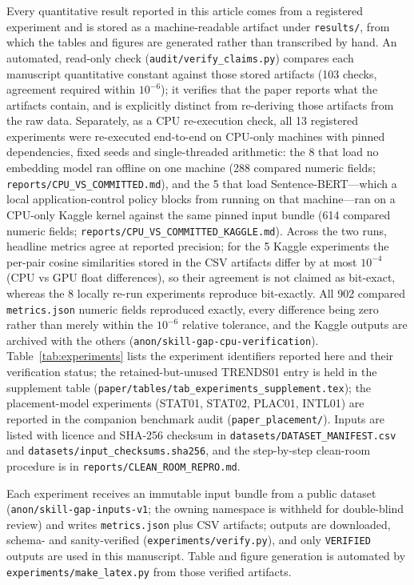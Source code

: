 \documentclass[journal]{IEEEtran}
\begin{document}
Every quantitative result reported in this article comes from a registered experiment and is stored as a machine-readable artifact under \texttt{results/}, from which the tables and figures are generated rather than transcribed by hand. An automated, read-only check (\texttt{audit/verify\_claims.py}) compares each manuscript quantitative constant against those stored artifacts (103 checks, agreement required within $10^{-6}$); it verifies that the paper reports what the artifacts contain, and is explicitly distinct from re-deriving those artifacts from the raw data. Separately, as a CPU re-execution check, all 13 registered experiments were re-executed end-to-end on CPU-only machines with pinned dependencies, fixed seeds and single-threaded arithmetic: the 8 that load no embedding model ran offline on one machine (288 compared numeric fields; \texttt{reports/CPU\_VS\_COMMITTED.md}), and the 5 that load Sentence-BERT---which a local application-control policy blocks from running on that machine---ran on a CPU-only Kaggle kernel against the same pinned input bundle (614 compared numeric fields; \texttt{reports/CPU\_VS\_COMMITTED\_KAGGLE.md}). Across the two runs, headline metrics agree at reported precision; for the 5 Kaggle experiments the per-pair cosine similarities stored in the CSV artifacts differ by at most $10^{-4}$ (CPU vs GPU float differences), so their agreement is not claimed as bit-exact, whereas the 8 locally re-run experiments reproduce bit-exactly. All 902 compared \texttt{metrics.json} numeric fields reproduced exactly, every difference being zero rather than merely within the $10^{-6}$ relative tolerance, and the Kaggle outputs are archived with the others (\texttt{anon/skill-gap-cpu-verification}). Table~\ref{tab:experiments} lists the experiment identifiers reported here and their verification status; the retained-but-unused TRENDS01 entry is held in the supplement table (\texttt{paper/tables/tab\_experiments\_supplement.tex}); the placement-model experiments (STAT01, STAT02, PLAC01, INTL01) are reported in the companion benchmark audit (\texttt{paper\_placement/}). Inputs are listed with licence and SHA-256 checksum in \texttt{datasets/DATASET\_MANIFEST.csv} and \texttt{datasets/input\_checksums.sha256}, and the step-by-step clean-room procedure is in \texttt{reports/CLEAN\_ROOM\_REPRO.md}.

\begin{table}[!htbp]
\centering
\caption{Experiment Registry: Provenance of All Reported Results (status per \texttt{results/registry.json})}
\label{tab:experiments}
\resizebox{\textwidth}{!}{%

}
\par\vspace{3pt}
{\footnotesize Each experiment receives an immutable input bundle from a public dataset (\texttt{anon/skill-gap-inputs-v1}; the owning namespace is withheld for double-blind review) and writes \texttt{metrics.json} plus CSV artifacts; outputs are downloaded, schema- and sanity-verified (\texttt{experiments/verify.py}), and only \texttt{VERIFIED} outputs are used in this manuscript. Table and figure generation is automated by \texttt{experiments/make\_latex.py} from those verified artifacts.}
\end{table}
\end{document}
